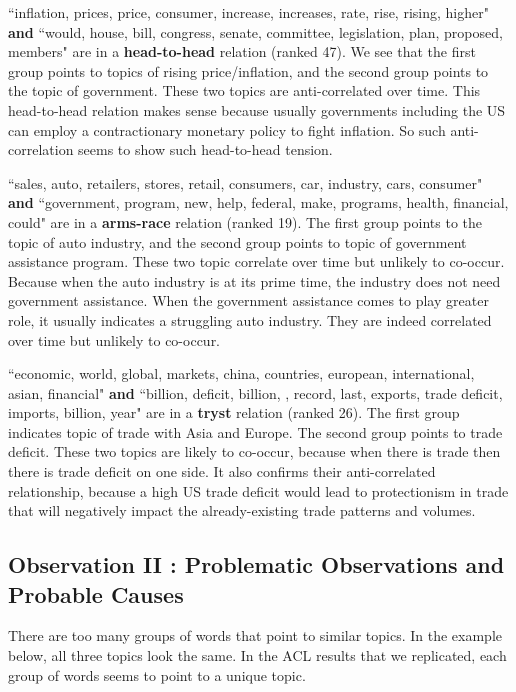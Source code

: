 \documentclass[11pt,a4paper]{article}
\newcommand\boldhead[1]{\textcolor{red-brown}{\textbf{#1}}}
\newcommand\boldtryst[1]{\textcolor{pinksherbet}{\textbf{#1}}}
\newcommand\boldarms[1]{\textcolor{blue(ncs)}{\textbf{#1}}}
\begin{document}
``inflation, prices, price, consumer, increase, increases, rate, rise, rising, higher"
\textbf{and} 
``would, house, bill, congress, senate, committee, legislation, plan, proposed, members" are in a
\boldhead{head-to-head} relation (ranked 47). We see that the first group points to topics of rising price/inflation, and the second group points to the topic of government. These two topics are anti-correlated over time. This head-to-head relation makes sense because usually governments including the US can employ a contractionary monetary policy to fight inflation. So such anti-correlation seems to show such head-to-head tension.  

``sales, auto, retailers, stores, retail, consumers, car, industry, cars, consumer" 
\textbf{and}
``government, program, new, help, federal, make, programs, health, financial, could" are in a \boldarms{arms-race} relation (ranked 19). The first group points to the topic of auto industry, and the second group points to topic of government assistance program. These two topic correlate over time but unlikely to co-occur. Because when the auto industry is at its prime time, the industry does not need government assistance. When the government assistance comes to play greater role, it usually indicates a struggling auto industry. They are indeed correlated over time but unlikely to co-occur. 

``economic, world, global, markets, china, countries, european, international, asian, financial"
\textbf{and} 
``billion, deficit, billion, , record, last, exports, trade deficit, imports, billion, year" are in a \boldtryst{tryst} relation (ranked 26). The first group indicates topic of trade with Asia and Europe. The second group points to trade deficit. These two topics are likely to co-occur, because when there is trade then there is trade deficit on one side. It also confirms their anti-correlated relationship, because a high US trade deficit would lead to protectionism in trade that will negatively impact the already-existing trade patterns and volumes. 




\subsection{Observation II : Problematic Observations and Probable Causes} 
There are too many groups of words that point to similar topics. In the example below, all three topics look the same. In the ACL results that we replicated, each group of words seems to point to a unique topic. 
\end{document}

